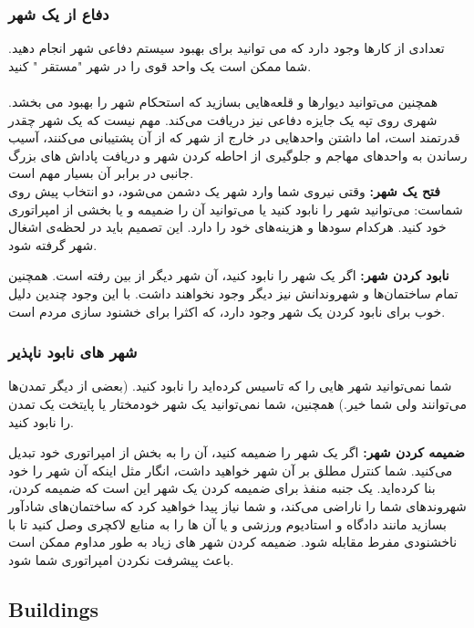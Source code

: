 \documentclass[]{article}
\begin{document}
\subsubsection*{{\titr دفاع از یک شهر}}
تعدادی از کارها وجود دارد که می توانید برای بهبود سیستم دفاعی شهر انجام دهید. شما ممکن است یک واحد قوی را در شهر "مستقر " کنید.\\
\\
همچنین می‌توانید دیوارها و قلعه‌هایی بسازید که استحکام شهر را بهبود می بخشد. شهری روی تپه یک جایزه دفاعی نیز دریافت می‌کند. مهم نیست که یک شهر چقدر قدرتمند است، اما داشتن واحدهایی در خارج از شهر که از آن پشتیبانی می‌کنند، آسیب رساندن به واحدهای مهاجم و جلوگیری از احاطه کردن شهر و دریافت پاداش های بزرگ جانبی در برابر آن بسیار مهم است.\\

\noindent \textbf{فتح یک شهر:}
وقتی نیروی شما وارد شهر یک دشمن می‌شود، دو انتخاب پیش روی شماست: می‌توانید شهر را نابود کنید یا می‌توانید آن را ضمیمه و یا بخشی از امپراتوری خود کنید. هرکدام سود‌ها و هزینه‌های خود را دارد. این تصمیم باید در لحظه‌ی اشغال شهر گرفته شود.

\noindent \textbf{نابود کردن شهر:}
اگر یک شهر را نابود کنید، آن شهر دیگر از بین رفته است. همچنین تمام ساختمان‌ها و شهروندانش نیز دیگر وجود نخواهند داشت. با این وجود چندین دلیل خوب برای نابود کردن یک شهر وجود دارد، که اکثرا برای خشنود سازی مردم است.

\subsubsection*{{\titr شهر های نابود ناپذیر}}
شما نمی‌توانید شهر هایی را که تاسیس کرده‌اید را نابود کنید. (بعضی از دیگر تمدن‌ها می‌‌توانند ولی شما خیر.) همچنین، شما نمی‌توانید یک شهر خودمختار یا پایتخت یک تمدن را نابود کنید.

\noindent \textbf{ضمیمه کردن شهر:} اگر یک شهر را ضمیمه کنید، آن را به بخش از امپراتوری خود تبدیل می‌کنید. شما کنترل مطلق بر آن شهر خواهید داشت، انگار مثل اینکه آن شهر را خود بنا کرده‌اید. یک جنبه منفذ برای ضمیمه کردن یک شهر این است که ضمیمه کردن، شهروندهای شما را ناراضی می‌کند،  و شما نیاز پیدا خواهید کرد که ساختمان‌های شادآور بسازید مانند دادگاه و استادیوم ورزشی  و یا آن ها را به منابع لاکچری وصل کنید تا با ناخشنودی مفرط مقابله شود. ضمیمه کردن شهر های زیاد به طور مداوم ممکن است باعث پیشرفت نکردن امپراتوری شما شود.


\subsection*{{\titr Buildings}}
\end{document}
